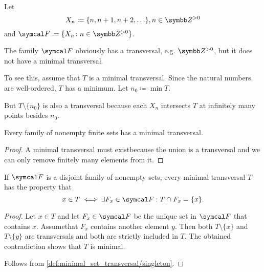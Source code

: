 \begin{example}\label{ex:no_minimal_set_transversal}\cite[90]{Lectures:logic_programming}
  Let
  \begin{equation*}
    X_n \coloneqq \{ n, n + 1, n + 2, \ldots \}, n \in \Z^{>0}
  \end{equation*}
  and \( \Cal{F} \coloneqq \{ X_n \colon n \in \Z^{>0} \} \).

  The family \( \Cal{F} \) obviously has a transversal, e.g. \( \Z^{>0} \), but it does not have a minimal transversal.

  To see this, assume that \( T \) is a minimal transversal. Since the natural numbers are well-ordered, \( T \) has a minimum. Let \( n_0 \coloneqq \min T \).

  But \( T \setminus \{ n_0 \} \) is also a transversal because each \( X_n \) intersects \( T \) at infinitely many points besides \( n_0 \).
\end{example}

\begin{proposition}\label{thm:finite_minimal_set_transversal}\cite[91]{Lectures:logic_programming}
  Every family of nonempty finite sets has a minimal transversal.
\end{proposition}
\begin{proof}
  A minimal transversal must exist\LEM because the union is a transversal and we can only remove finitely many elements from it.
\end{proof}

\begin{proposition}\label{thm:disjoint_minimal_set_transversal}
  If \( \Cal{F} \) is a disjoint family of nonempty sets, every minimal transversal \( T \) has the property that
  \begin{equation*}
    x \in T \iff \exists F_x \in \Cal{F}: T \cap F_x = \{ x \}.
  \end{equation*}
\end{proposition}
\begin{proof}
  \Implies Let \( x \in T \) and let \( F_x \in \Cal{F} \) be the unique set in \( \Cal{F} \) that contains \( x \). Assume\LEM that \( F_x \) contains another element \( y \). Then both \( T \setminus \{ x \} \) and \( T \setminus \{ y \} \) are transversals and both are strictly included in \( T \). The obtained contradiction shows that \( T \) is minimal.

  \ImpliedBy Follows from \cref{def:minimal_set_transversal/singleton}.
\end{proof}
